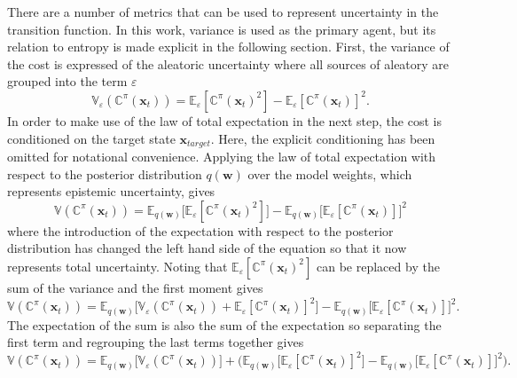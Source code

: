 There are a number of metrics that can be used to represent uncertainty in the transition function. In this work, variance is used as the primary agent, but its relation to entropy is made explicit in the following section. First, the variance of the cost is expressed of the aleatoric uncertainty where all sources of aleatory are grouped into the term  $\varepsilon$
\begin{equation}
    \mathbb{V}_{\varepsilon}\left(\mathbb{C}^{\pi}\left(\mathbf{x}_{t}\right)\right)=\mathbb{E}_{\varepsilon}\left[\mathbb{C}^{\pi}(\mathbf{x}_{t})^{2}\right] - \mathbb{E}_{\varepsilon}\left[\mathbb{C}^{\pi}(\mathbf{x}_{t})\right]^{2}.
\end{equation}
In order to make use of the law of total expectation in the next step, the cost is conditioned on the target state $\mathbf{x}_{target}$. Here, the explicit conditioning has been omitted for notational convenience. Applying the law of total expectation with respect to the posterior distribution $q(\mathbf{w})$ over the model weights, which represents epistemic uncertainty, gives
\begin{equation}
    \mathbb{V}\left(\mathbb{C}^{\pi}\left(\mathbf{x}_{t}\right)\right)=\mathbb{E}_{q(\mathbf{w})}\big[\mathbb{E}_{\varepsilon}\left[\mathbb{C}^{\pi}(\mathbf{x}_{t})^{2}\right]\big] - \mathbb{E}_{q(\mathbf{w})}\big[\mathbb{E}_{\varepsilon}\left[\mathbb{C}^{\pi}(\mathbf{x}_{t})\right]\big]^{2}
\end{equation}
where the introduction of the expectation with respect to the posterior distribution has changed the left hand side of the equation so  that it now represents total uncertainty. Noting that $\mathbb{E}_{\varepsilon}\left[\mathbb{C}^{\pi}(\mathbf{x}_{t})^{2}\right]$ can be replaced by the sum of the variance and the first moment gives
\begin{equation}
    \mathbb{V}\left(\mathbb{C}^{\pi}\left(\mathbf{x}_{t}\right)\right)=\mathbb{E}_{q(\mathbf{w})}\big[\mathbb{V}_{\varepsilon}\left(\mathbb{C}^{\pi}(\mathbf{x}_{t})\right)+\mathbb{E}_{\varepsilon}\left[\mathbb{C}^{\pi}(\mathbf{x}_{t})\right]^{2}\big] - \mathbb{E}_{q(\mathbf{w})}\big[\mathbb{E}_{\varepsilon}\left[\mathbb{C}^{\pi}(\mathbf{x}_{t})\right]\big]^{2}.
\end{equation}
The expectation of the sum is also the sum of the expectation so separating the first term and regrouping the last terms together gives
\begin{equation}
    \mathbb{V}\left(\mathbb{C}^{\pi}\left(\mathbf{x}_{t}\right)\right)=\mathbb{E}_{q(\mathbf{w})}\big[\mathbb{V}_{\varepsilon}\left(\mathbb{C}^{\pi}(\mathbf{x}_{t})\right)\big] + \bigg(\mathbb{E}_{q(\mathbf{w})}\big[\mathbb{E}_{\varepsilon}\left[\mathbb{C}^{\pi}(\mathbf{x}_{t})\right]^{2}\big]- \mathbb{E}_{q(\mathbf{w})}\big[\mathbb{E}_{\varepsilon}\left[\mathbb{C}^{\pi}(\mathbf{x}_{t})\right]\big]^{2}\bigg).
\end{equation}
